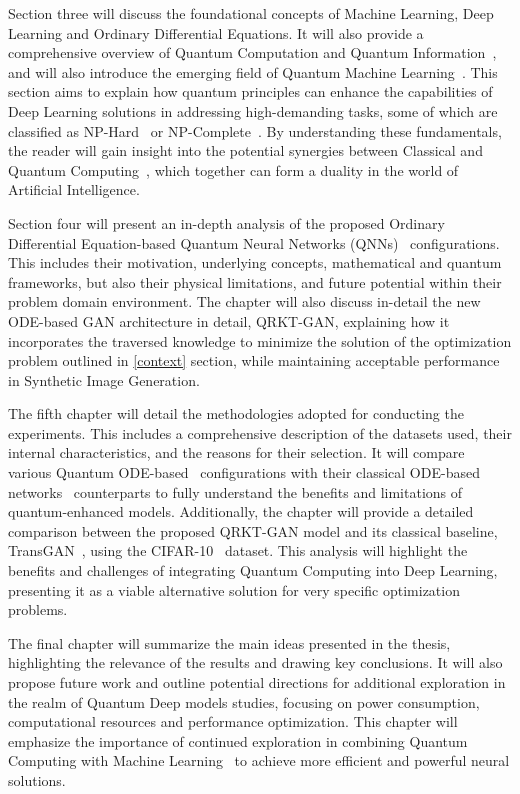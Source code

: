 \documentclass[12pt,a4paper]{report}
\begin{document}
Section three will discuss the foundational concepts of Machine Learning, Deep Learning and Ordinary Differential Equations. It will also provide a comprehensive overview of Quantum Computation and Quantum Information~\cite{nielsen2001quantum}, and will also introduce the emerging field of Quantum Machine Learning~\cite{dunjko2018machine}. This section aims to explain how quantum principles can enhance the capabilities of Deep Learning solutions in addressing high-demanding tasks, some of which are classified as NP-Hard~\cite{chatterjee2024solving} or NP-Complete~\cite{furer2008solving}. By understanding these fundamentals, the reader will gain insight into the potential synergies between Classical and Quantum Computing~\cite{nielsen2001quantum}, which together can form a duality in the world of Artificial Intelligence.

Section four will present an in-depth analysis of the proposed Ordinary Differential Equation-based Quantum Neural Networks (QNNs)~\cite{abbas2021power, li2022ode} configurations. This includes their motivation, underlying concepts, mathematical and quantum frameworks, but also their physical limitations, and future potential within their problem domain environment. The chapter will also discuss in-detail the new ODE-based GAN architecture in detail, QRKT-GAN, explaining how it incorporates the traversed knowledge to minimize the solution of the optimization problem outlined in \ref{context} section, while maintaining acceptable performance in Synthetic Image Generation.

The fifth chapter will detail the methodologies adopted for conducting the experiments. This includes a comprehensive description of the datasets used, their internal characteristics, and the reasons for their selection. It will compare various Quantum ODE-based~\cite{fan2024Quantum} configurations with their classical ODE-based networks~\cite{zhong2022neural} counterparts to fully understand the benefits and limitations of quantum-enhanced models. Additionally, the chapter will provide a detailed comparison between the proposed QRKT-GAN model and its classical baseline, TransGAN~\cite{jiang2021transgan}, using the CIFAR-10~\cite{Krizhevsky09learningmultiple} dataset. This analysis will highlight the benefits and challenges of integrating Quantum Computing into Deep Learning, presenting it as a viable alternative solution for very specific optimization problems.

The final chapter will summarize the main ideas presented in the thesis, highlighting the relevance of the results and drawing key conclusions. It will also propose future work and outline potential directions for additional exploration in the realm of Quantum Deep models studies, focusing on power consumption, computational resources and performance optimization. This chapter will emphasize the importance of continued exploration in combining Quantum Computing with Machine Learning~\cite{dunjko2018machine} to achieve more efficient and powerful neural solutions.
\end{document}
